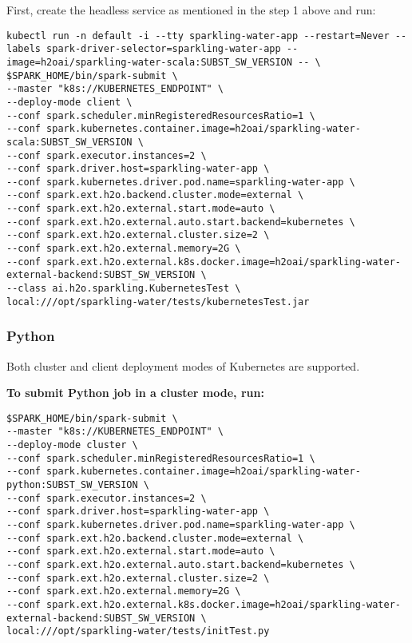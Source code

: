 First, create the headless service as mentioned in the step 1 above and run:

\begin{lstlisting}[style=Bash]
kubectl run -n default -i --tty sparkling-water-app --restart=Never --labels spark-driver-selector=sparkling-water-app --image=h2oai/sparkling-water-scala:SUBST_SW_VERSION -- \
$SPARK_HOME/bin/spark-submit \
--master "k8s://KUBERNETES_ENDPOINT" \
--deploy-mode client \
--conf spark.scheduler.minRegisteredResourcesRatio=1 \
--conf spark.kubernetes.container.image=h2oai/sparkling-water-scala:SUBST_SW_VERSION \
--conf spark.executor.instances=2 \
--conf spark.driver.host=sparkling-water-app \
--conf spark.kubernetes.driver.pod.name=sparkling-water-app \
--conf spark.ext.h2o.backend.cluster.mode=external \
--conf spark.ext.h2o.external.start.mode=auto \
--conf spark.ext.h2o.external.auto.start.backend=kubernetes \
--conf spark.ext.h2o.external.cluster.size=2 \
--conf spark.ext.h2o.external.memory=2G \
--conf spark.ext.h2o.external.k8s.docker.image=h2oai/sparkling-water-external-backend:SUBST_SW_VERSION \
--class ai.h2o.sparkling.KubernetesTest \
local:///opt/sparkling-water/tests/kubernetesTest.jar
\end{lstlisting}

\subsubsection{Python}

Both cluster and client deployment modes of Kubernetes are supported.

\textbf{To submit Python job in a cluster mode, run:}

\begin{lstlisting}[style=Bash]
$SPARK_HOME/bin/spark-submit \
--master "k8s://KUBERNETES_ENDPOINT" \
--deploy-mode cluster \
--conf spark.scheduler.minRegisteredResourcesRatio=1 \
--conf spark.kubernetes.container.image=h2oai/sparkling-water-python:SUBST_SW_VERSION \
--conf spark.executor.instances=2 \
--conf spark.driver.host=sparkling-water-app \
--conf spark.kubernetes.driver.pod.name=sparkling-water-app \
--conf spark.ext.h2o.backend.cluster.mode=external \
--conf spark.ext.h2o.external.start.mode=auto \
--conf spark.ext.h2o.external.auto.start.backend=kubernetes \
--conf spark.ext.h2o.external.cluster.size=2 \
--conf spark.ext.h2o.external.memory=2G \
--conf spark.ext.h2o.external.k8s.docker.image=h2oai/sparkling-water-external-backend:SUBST_SW_VERSION \
local:///opt/sparkling-water/tests/initTest.py
\end{lstlisting}

